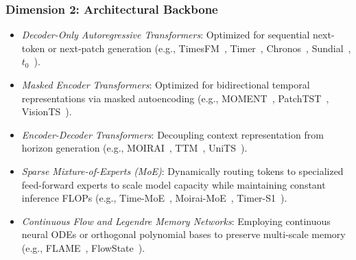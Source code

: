 \subsubsection{Dimension 2: Architectural Backbone}
\begin{itemize}[leftmargin=*]
    \item \emph{Decoder-Only Autoregressive Transformers}: Optimized for sequential next-token or next-patch generation (e.g., TimesFM~\cite{das2024timesfm}, Timer~\cite{liu2024timer}, Chronos~\cite{ansari2024chronos}, Sundial~\cite{thuml2025sundial}, $t_0$~\cite{meyer2026t0}).
    \item \emph{Masked Encoder Transformers}: Optimized for bidirectional temporal representations via masked autoencoding (e.g., MOMENT~\cite{goswami2024moment}, PatchTST~\cite{nie2023patchtst}, VisionTS~\cite{chen2024visionts}).
    \item \emph{Encoder-Decoder Transformers}: Decoupling context representation from horizon generation (e.g., MOIRAI~\cite{woo2024moirai}, TTM~\cite{ekambaram2024ttm}, UniTS~\cite{zhou2024units}).
    \item \emph{Sparse Mixture-of-Experts (MoE)}: Dynamically routing tokens to specialized feed-forward experts to scale model capacity while maintaining constant inference FLOPs (e.g., Time-MoE~\cite{shi2024timemoe}, Moirai-MoE~\cite{woo2024moiraimoe}, Timer-S1~\cite{thuml2026timers1}).
    \item \emph{Continuous Flow and Legendre Memory Networks}: Employing continuous neural ODEs or orthogonal polynomial bases to preserve multi-scale memory (e.g., FLAME~\cite{wu2025flame}, FlowState~\cite{king2025flowstate}).
\end{itemize}

